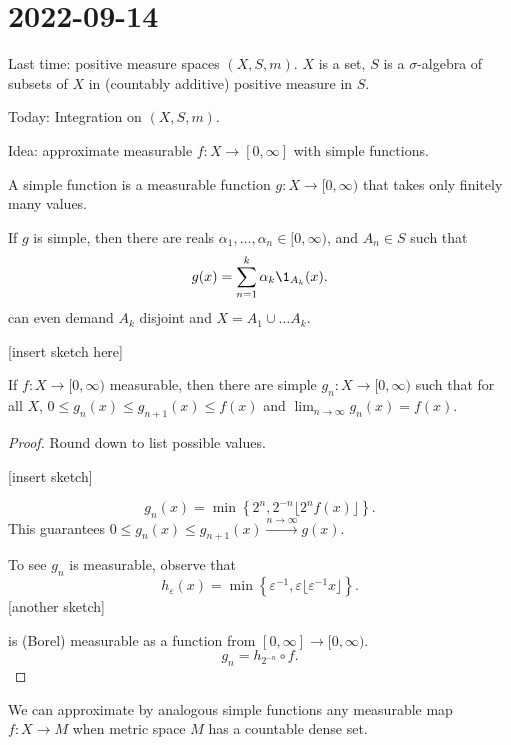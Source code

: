 \section{2022-09-14}

Last time: positive measure spaces $(X, S, m)$. $X$ is a set, $S$ is a $\sigma$-algebra of subsets of $X$ in (countably additive) positive measure in $S$.

Today: Integration on $(X, S, m)$.

Idea: approximate measurable $f : X \to [0, \infty]$ with simple functions.

\begin{definition}
	A simple function is a measurable function $g : X \to [0, \infty)$ that takes only finitely many values.
\end{definition}

If $g$ is simple, then there are reals $\alpha_1, \ldots, \alpha_n \in [0, \infty)$, and $A_n \in S$ such that
\[
	g(x) = \sum_{n = 1}^{k} \alpha_k \1_{A_k}(x).
\]
can even demand $A_k$ disjoint and $X = A_1 \cup \ldots A_k$.

[insert sketch here]

\begin{theorem}
	If $f : X \to [0, \infty)$ measurable, then there are simple $g_n : X \to [0, \infty)$ such that for all $X$, $0 \leq g_n(x) \leq g_{n+1}(x) \leq f(x)$ and $\lim_{n \to \infty} g_n(x) = f(x)$.
\end{theorem}

\begin{proof}
  Round down to list possible values.

	[insert sketch]

	\[
		g_n(x) = \min \left\{2^n, 2^{-n} \lfloor 2^n f(x) \rfloor \right\}.
	\]
	This guarantees $0 \leq g_n(x) \leq g_{n+1}(x) \xrightarrow{n \to \infty} g(x)$.

	To see $g_n$ is measurable, observe that
	\[
		h_\varepsilon (x) = \min \left\{\varepsilon^{-1}, \varepsilon \lfloor \varepsilon^{-1} x \rfloor\right\}.
	\]
	[another sketch]

	is (Borel) measurable as a function from $[0, \infty] \to [0, \infty)$.
	\[
		g_n = h_{2^{-n}} \circ f.
	\]
\end{proof}

\begin{remark}
  We can approximate by analogous simple functions any measurable map $f : X \to M$ when metric space $M$ has a countable dense set.
\end{remark}

